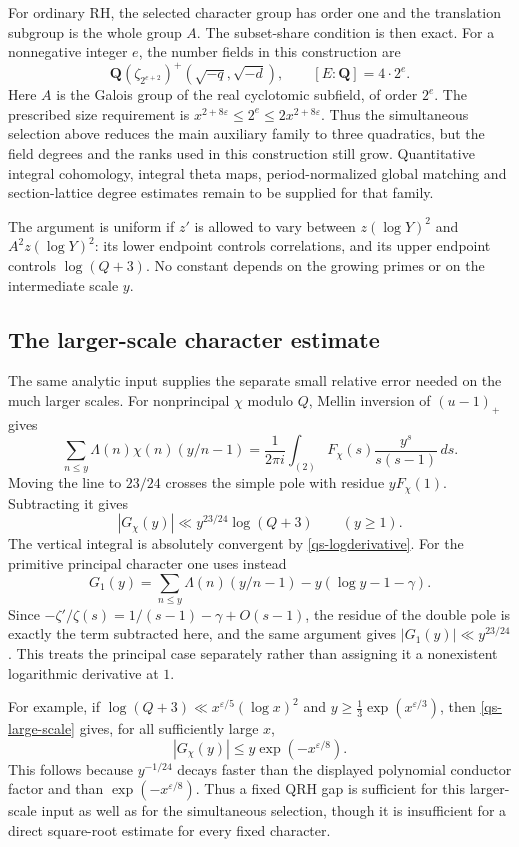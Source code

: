 For ordinary RH, the selected character group has order one and the
translation subgroup is the whole group $A$. The subset-share condition
is then exact. For a nonnegative integer $e$, the number fields in this construction are
\[
 \mathbf Q(\zeta_{2^{e+2}})^+(\sqrt{-q},\sqrt{-d}),
 \qquad [E:\mathbf Q]=4\cdot2^e.
\]
Here $A$ is the Galois group of the real cyclotomic subfield, of order
$2^e$. The prescribed size requirement is
$x^{2+8\varepsilon}\le2^e\le2x^{2+8\varepsilon}$.
Thus the simultaneous selection above reduces the main auxiliary
family to three quadratics, but the field degrees and the ranks used in this construction still grow. Quantitative integral cohomology, integral theta
maps, period-normalized global matching and section-lattice degree
estimates remain to be supplied for that family.

The argument is uniform if $z'$ is allowed to vary between
$z(\log Y)^2$ and $A^2z(\log Y)^2$: its lower endpoint
controls correlations, and its upper endpoint controls
$\log(Q+3)$. No constant depends on the growing primes or on
the intermediate scale $y$.

\subsection{The larger-scale character estimate}

The same analytic input supplies the separate small relative error
needed on the much larger scales. For nonprincipal $\chi$ modulo
$Q$, Mellin inversion of $(u-1)_+$ gives
\[
 \sum_{n\le y}\Lambda(n)\chi(n)(y/n-1)
 =\frac1{2\pi i}\int_{(2)}
             F_\chi(s)\frac{y^s}{s(s-1)}\,ds.
\]
Moving the line to $23/24$ crosses the simple pole with residue
$yF_\chi(1)$. Subtracting it gives
\begin{equation}\label{qs-large-scale}
 |G_\chi(y)|\ll y^{23/24}\log(Q+3)\qquad(y\ge1).
\end{equation}
The vertical integral is absolutely convergent by
\eqref{qs-logderivative}. For the primitive principal character
one uses instead
\[
 G_1(y)=\sum_{n\le y}\Lambda(n)(y/n-1)
                   -y(\log y-1-\gamma).
\]
Since $-\zeta'/\zeta(s)=1/(s-1)-\gamma+O(s-1)$, the residue
of the double pole is exactly the term subtracted here, and the
same argument gives $|G_1(y)|\ll y^{23/24}$.
This treats the principal case separately rather than assigning
it a nonexistent logarithmic derivative at $1$.

For example, if $\log(Q+3)\ll x^{\varepsilon/5}(\log x)^2$
and $y\ge\tfrac13\exp(x^{\varepsilon/3})$, then
\eqref{qs-large-scale} gives, for all sufficiently large $x$,
\[
 |G_\chi(y)|\le y\exp(-x^{\varepsilon/8}).
\]
This follows because $y^{-1/24}$ decays faster than the displayed
polynomial conductor factor and than $\exp(-x^{\varepsilon/8})$.
Thus a fixed QRH gap is sufficient for this larger-scale input
as well as for the simultaneous selection, though it is
insufficient for a direct square-root estimate for every fixed
character.

